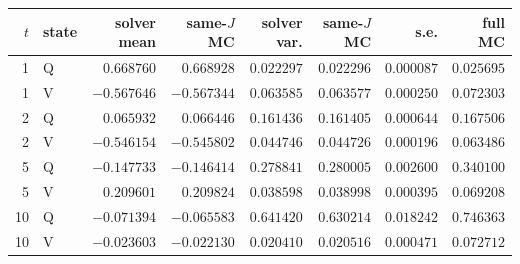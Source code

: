 \begin{tabular}{rlrrrrrr}\toprule
$t$ & state & solver mean & same-$J$ MC & solver var. & same-$J$ MC & s.e. & full MC\\\midrule
1 & Q & $0.668760$ & $0.668928$ & $0.022297$ & $0.022296$ & $0.000087$ & $0.025695$\\
1 & V & $-0.567646$ & $-0.567344$ & $0.063585$ & $0.063577$ & $0.000250$ & $0.072303$\\
2 & Q & $0.065932$ & $0.066446$ & $0.161436$ & $0.161405$ & $0.000644$ & $0.167506$\\
2 & V & $-0.546154$ & $-0.545802$ & $0.044746$ & $0.044726$ & $0.000196$ & $0.063486$\\
5 & Q & $-0.147733$ & $-0.146414$ & $0.278841$ & $0.280005$ & $0.002600$ & $0.340100$\\
5 & V & $0.209601$ & $0.209824$ & $0.038598$ & $0.038998$ & $0.000395$ & $0.069208$\\
10 & Q & $-0.071394$ & $-0.065583$ & $0.641420$ & $0.630214$ & $0.018242$ & $0.746363$\\
10 & V & $-0.023603$ & $-0.022130$ & $0.020410$ & $0.020516$ & $0.000471$ & $0.072712$\\
\bottomrule\end{tabular}
